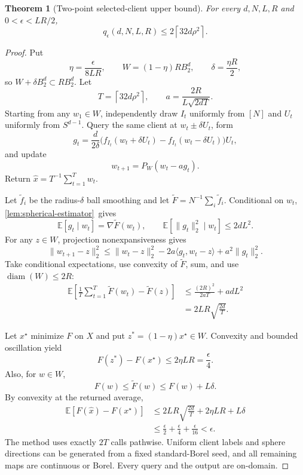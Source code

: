 \documentclass[11pt]{article}
\numberwithin{equation}{section}
\newtheorem{theorem}{Theorem}[section]
\theoremstyle{remark}
\theoremstyle{definition}
\newcommand{\E}{\mathbb{E}}
\newcommand{\Ball}{B_2}
\newcommand{\ip}[2]{\langle #1,#2\rangle}
\newcommand{\norm}[1]{\lVert #1\rVert_2}
\newcommand{\eps}{\epsilon}
\DeclareMathOperator{\diam}{diam}
\begin{document}
\begin{theorem}[Two-point selected-client upper bound]
\label{thm:two-point-upper}
For every $d,N,L,R$ and $0<\eps<LR/2$,
\[
q_\eps(d,N,L,R)
\le2\left\lceil32d\rho^2\right\rceil.
\]
\end{theorem}

\begin{proof}
Put
\[
\eta=\frac{\eps}{8LR},
\qquad
W=(1-\eta)R\Ball^d,
\qquad
\delta=\frac{\eta R}{2},
\]
so $W+\delta\Ball^d\subset R\Ball^d$.  Let
\[
T=\left\lceil32d\rho^2\right\rceil,
\qquad
a=\frac{2R}{L\sqrt{2dT}}.
\]
Starting from any $w_1\in W$, independently draw $I_t$ uniformly from $[N]$ and $U_t$ uniformly from $S^{d-1}$.  Query the same client at $w_t\pm\delta U_t$, form
\[
g_t=\frac d{2\delta}
\bigl(f_{I_t}(w_t+\delta U_t)-f_{I_t}(w_t-\delta U_t)\bigr)U_t,
\]
and update
\[
w_{t+1}=P_W(w_t-ag_t).
\]
Return $\widehat x=T^{-1}\sum_{t=1}^T w_t$.

Let $\widetilde f_i$ be the radius-$\delta$ ball smoothing and let $\widetilde F=N^{-1}\sum_i\widetilde f_i$.  Conditional on $w_t$, \cref{lem:spherical-estimator}~gives
\[
\E[g_t\mid w_t]=\nabla\widetilde F(w_t),
\qquad
\E[\norm{g_t}^2\mid w_t]\le2dL^2.
\]
For any $z\in W$, projection nonexpansiveness gives
\[
\norm{w_{t+1}-z}^2
\le\norm{w_t-z}^2
-2a\ip{g_t}{w_t-z}+a^2\norm{g_t}^2.
\]
Take conditional expectations, use convexity of $\widetilde F$, sum, and use $\diam(W)\le2R$:
\begin{align*}
\E\left[\frac1T\sum_{t=1}^T\widetilde F(w_t)-\widetilde F(z)\right]
&\le \frac{(2R)^2}{2aT}+adL^2\\
&=2LR\sqrt{\frac{2d}{T}}.
\end{align*}

Let $x^\star$ minimize $F$ on $X$ and put $z^*=(1-\eta)x^\star\in W$. Convexity and bounded oscillation yield
\[
F(z^*)-F(x^\star)\le2\eta LR=\frac\eps4.
\]
Also, for $w\in W$,
\[
F(w)\le\widetilde F(w)\le F(w)+L\delta.
\]
By convexity at the returned average,
\begin{align*}
\E[F(\widehat x)-F(x^\star)]
&\le2LR\sqrt{\frac{2d}{T}}+2\eta LR+L\delta\\
&\le\frac\eps2+\frac\eps4+\frac\eps{16}<\eps.
\end{align*}
The method uses exactly $2T$ calls pathwise.  Uniform client labels and sphere directions can be generated from a fixed standard-Borel seed, and all remaining maps are continuous or Borel.  Every query and the output are on-domain.
\end{proof}
\end{document}
